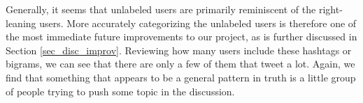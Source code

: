             \newline\indent
        Generally, it seems that unlabeled users are primarily reminiscent of the right-leaning users. 
        More accurately categorizing the unlabeled users is therefore one of the most immediate future improvements to our project, as is further discussed in Section \ref{sec_disc_improv}. Reviewing how many users include these hashtags or bigrams, we can see that there are only a few of them that tweet a lot. Again, we find that something that appears to be a general pattern in truth is a little group of people trying to push some topic in the discussion.